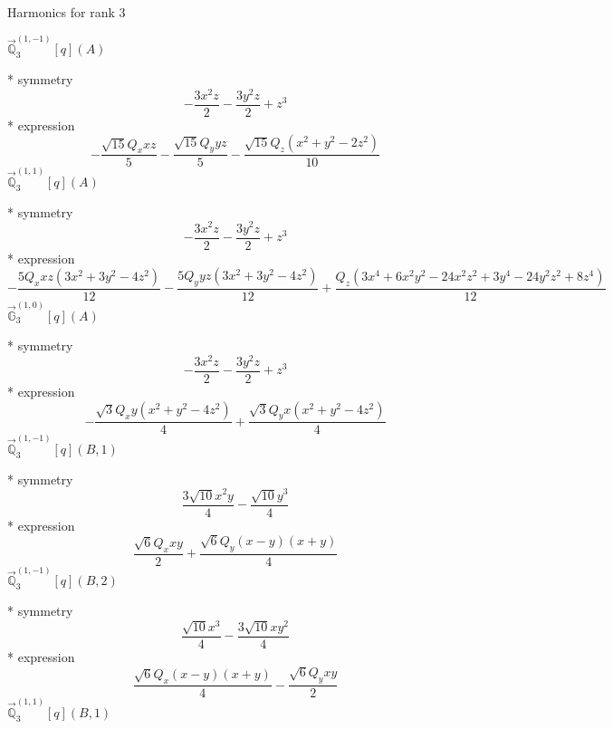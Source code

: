 \documentclass[fleqn,8pt]{jsarticle}
\begin{document}
\noindent * Harmonics for rank 3

\noindent\quad $\vec{\mathbb{Q}}_{3}^{(1,-1)}[q](A)$

\noindent\quad ** symmetry
\begin{dmath*}
- \frac{3 x^{2} z}{2} - \frac{3 y^{2} z}{2} + z^{3}
\end{dmath*}
\noindent\quad ** expression
\begin{dmath*}
- \frac{\sqrt{15} Q_{x} x z}{5} - \frac{\sqrt{15} Q_{y} y z}{5} - \frac{\sqrt{15} Q_{z} \left(x^{2} + y^{2} - 2 z^{2}\right)}{10}
\end{dmath*}
\noindent\quad $\vec{\mathbb{Q}}_{3}^{(1,1)}[q](A)$

\noindent\quad ** symmetry
\begin{dmath*}
- \frac{3 x^{2} z}{2} - \frac{3 y^{2} z}{2} + z^{3}
\end{dmath*}
\noindent\quad ** expression
\begin{dmath*}
- \frac{5 Q_{x} x z \left(3 x^{2} + 3 y^{2} - 4 z^{2}\right)}{12} - \frac{5 Q_{y} y z \left(3 x^{2} + 3 y^{2} - 4 z^{2}\right)}{12} + \frac{Q_{z} \left(3 x^{4} + 6 x^{2} y^{2} - 24 x^{2} z^{2} + 3 y^{4} - 24 y^{2} z^{2} + 8 z^{4}\right)}{12}
\end{dmath*}
\noindent\quad $\vec{\mathbb{G}}_{3}^{(1,0)}[q](A)$

\noindent\quad ** symmetry
\begin{dmath*}
- \frac{3 x^{2} z}{2} - \frac{3 y^{2} z}{2} + z^{3}
\end{dmath*}
\noindent\quad ** expression
\begin{dmath*}
- \frac{\sqrt{3} Q_{x} y \left(x^{2} + y^{2} - 4 z^{2}\right)}{4} + \frac{\sqrt{3} Q_{y} x \left(x^{2} + y^{2} - 4 z^{2}\right)}{4}
\end{dmath*}
\noindent\quad $\vec{\mathbb{Q}}_{3}^{(1,-1)}[q](B,1)$

\noindent\quad ** symmetry
\begin{dmath*}
\frac{3 \sqrt{10} x^{2} y}{4} - \frac{\sqrt{10} y^{3}}{4}
\end{dmath*}
\noindent\quad ** expression
\begin{dmath*}
\frac{\sqrt{6} Q_{x} x y}{2} + \frac{\sqrt{6} Q_{y} \left(x - y\right) \left(x + y\right)}{4}
\end{dmath*}
\noindent\quad $\vec{\mathbb{Q}}_{3}^{(1,-1)}[q](B,2)$

\noindent\quad ** symmetry
\begin{dmath*}
\frac{\sqrt{10} x^{3}}{4} - \frac{3 \sqrt{10} x y^{2}}{4}
\end{dmath*}
\noindent\quad ** expression
\begin{dmath*}
\frac{\sqrt{6} Q_{x} \left(x - y\right) \left(x + y\right)}{4} - \frac{\sqrt{6} Q_{y} x y}{2}
\end{dmath*}
\noindent\quad $\vec{\mathbb{Q}}_{3}^{(1,1)}[q](B,1)$
\end{document}
